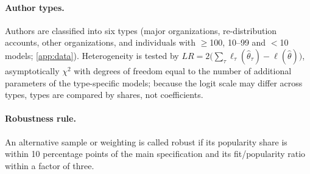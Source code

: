 \paragraph{Author types.} Authors are classified into six types (major organizations, re-distribution accounts,
other organizations, and individuals with $\ge$100, 10--99 and $<$10 models; \cref{app:data}). Heterogeneity is
tested by $LR = 2\big(\sum_\tau \ell_\tau(\hat\theta_\tau) - \ell(\hat\theta)\big)$, asymptotically $\chi^2$ with
degrees of freedom equal to the number of additional parameters of the type-specific models; because the logit scale may differ across types, types are compared by
shares, not coefficients.

\paragraph{Robustness rule.} An alternative sample or weighting is called robust if its popularity share is within 10
percentage points of the main specification and its fit/popularity ratio within a factor of three.
